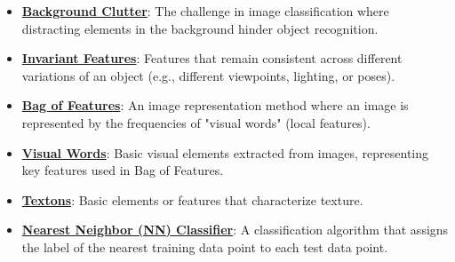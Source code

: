 \documentclass{article}%
\begin{document}
\begin{itemize}[leftmargin=*]
\item \href{https://purdue.brightspace.com/d2l/common/assets/pdfjs-d2l-dist/1.0.14-legacy/web/viewer.html?file=%2Fcontent%2Fenforced%2F1095467-wl.202510.CS.24300.001%2F07L2-Vision.pdf%3Fou%3D1095467&lang=en-us&container=d2l-fileviewer-rendered-pdf&fullscreen=d2l-fileviewer-rendered-pdf-dialog&height=667#page=10}{\textbf{Background Clutter}}: The challenge in image classification where distracting elements in the background hinder object recognition.%
\item \href{https://purdue.brightspace.com/d2l/common/assets/pdfjs-d2l-dist/1.0.14-legacy/web/viewer.html?file=%2Fcontent%2Fenforced%2F1095467-wl.202510.CS.24300.001%2F07L2-Vision.pdf%3Fou%3D1095467&lang=en-us&container=d2l-fileviewer-rendered-pdf&fullscreen=d2l-fileviewer-rendered-pdf-dialog&height=667#page=11}{\textbf{Invariant Features}}: Features that remain consistent across different variations of an object (e.g., different viewpoints, lighting, or poses).%
\item \href{https://purdue.brightspace.com/d2l/common/assets/pdfjs-d2l-dist/1.0.14-legacy/web/viewer.html?file=%2Fcontent%2Fenforced%2F1095467-wl.202510.CS.24300.001%2F07L2-Vision.pdf%3Fou%3D1095467&lang=en-us&container=d2l-fileviewer-rendered-pdf&fullscreen=d2l-fileviewer-rendered-pdf-dialog&height=667#page=12}{\textbf{Bag of Features}}: An image representation method where an image is represented by the frequencies of "visual words" (local features).%
\item \href{https://purdue.brightspace.com/d2l/common/assets/pdfjs-d2l-dist/1.0.14-legacy/web/viewer.html?file=%2Fcontent%2Fenforced%2F1095467-wl.202510.CS.24300.001%2F07L2-Vision.pdf%3Fou%3D1095467&lang=en-us&container=d2l-fileviewer-rendered-pdf&fullscreen=d2l-fileviewer-rendered-pdf-dialog&height=667#page=14}{\textbf{Visual Words}}: Basic visual elements extracted from images, representing key features used in Bag of Features.%
\item \href{https://purdue.brightspace.com/d2l/common/assets/pdfjs-d2l-dist/1.0.14-legacy/web/viewer.html?file=%2Fcontent%2Fenforced%2F1095467-wl.202510.CS.24300.001%2F07L2-Vision.pdf%3Fou%3D1095467&lang=en-us&container=d2l-fileviewer-rendered-pdf&fullscreen=d2l-fileviewer-rendered-pdf-dialog&height=667#page=28}{\textbf{Textons}}: Basic elements or features that characterize texture.%
\item \href{https://purdue.brightspace.com/d2l/common/assets/pdfjs-d2l-dist/1.0.14-legacy/web/viewer.html?file=%2Fcontent%2Fenforced%2F1095467-wl.202510.CS.24300.001%2F07L2-Vision.pdf%3Fou%3D1095467&lang=en-us&container=d2l-fileviewer-rendered-pdf&fullscreen=d2l-fileviewer-rendered-pdf-dialog&height=667#page=30}{\textbf{Nearest Neighbor (NN) Classifier}}: A classification algorithm that assigns the label of the nearest training data point to each test data point.%

\end{itemize}
\end{document}
